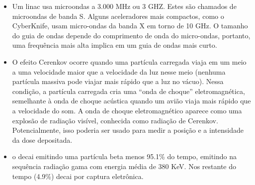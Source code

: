 \documentclass[11pt,a4paper]{article}
\begin{document}
\begin{itemize}
    \item Um linac usa microondas a 3.000 MHz ou 3 GHZ. Estes são chamados de microondas de banda S. Alguns aceleradores mais compactos, como o CyberKnife, usam micro-ondas da banda X em torno de 10 GHz. O tamanho do guia de ondas depende do comprimento de onda do micro-ondas, portanto, uma frequência mais alta implica em um guia de ondas mais curto.
    
    \item O efeito Cerenkov ocorre quando uma partícula carregada viaja em um meio a uma velocidade maior que a velocidade da luz nesse meio (nenhuma partícula massiva pode viajar mais rápido que a luz no vácuo). Nessa condição, a partícula carregada cria uma “onda de choque” eletromagnética, semelhante à onda de choque acústica quando um avião viaja mais rápido que a velocidade do som. A onda de choque eletromagnético aparece como uma explosão de radiação visível, conhecida como radiação de Cerenkov. Potencialmente, isso poderia ser usado para medir a posição e a intensidade da dose depositada.
    
    \item o  decai emitindo uma partícula beta menos 95.1\% do tempo, emitindo na sequência radiação gama com energia média de 380 KeV. Nos restante do tempo (4.9\%) decai por captura eletrônica.
    
   
\end{itemize}
\end{document}
